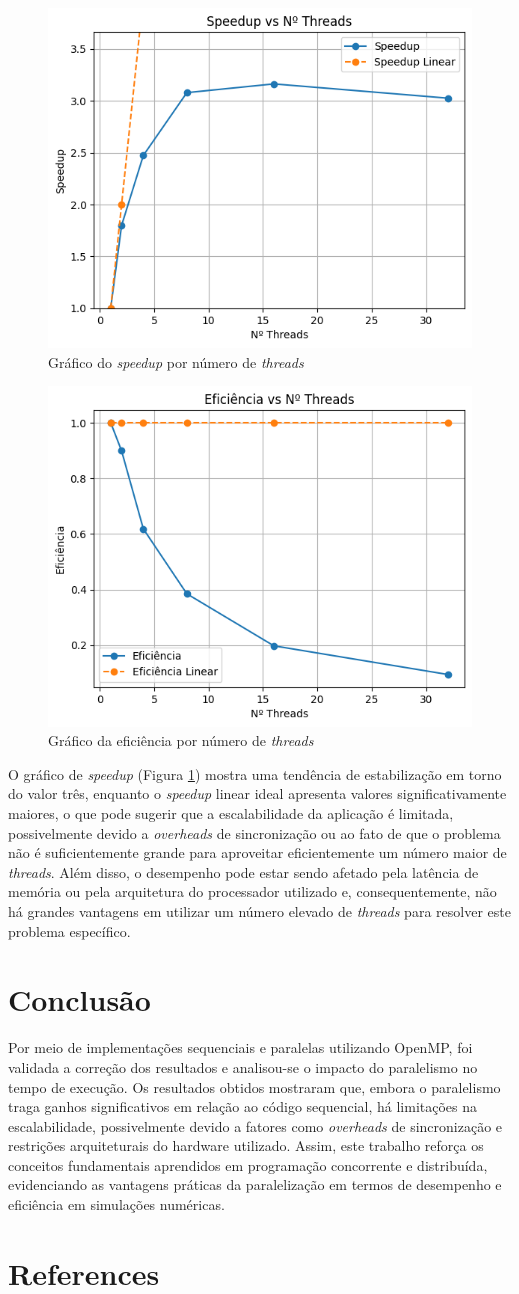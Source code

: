 \documentclass[12pt]{article}
\begin{document}
\begin{figure}[ht]
\centering
\includegraphics[width=.5\textwidth]{figs/speedupxthreads.png}
\caption{Gráfico do \textit{speedup} por número de \textit{threads}}
\label{fig:speedupOMP}
\end{figure}

\begin{figure}[ht]
\centering
\includegraphics[width=.5\textwidth]{figs/eficienciaxthreads.png}
\caption{Gráfico da eficiência por número de \textit{threads}}
\label{fig:eficienciaOMP}
\end{figure}


O gráfico de \textit{speedup} (Figura \ref{fig:speedupOMP}) mostra uma tendência de estabilização em torno do valor três, enquanto o \textit{speedup} linear ideal apresenta valores significativamente maiores, o que pode sugerir que a escalabilidade da aplicação é limitada, possivelmente devido a \textit{overheads} de sincronização ou ao fato de que o problema não é suficientemente grande para aproveitar eficientemente um número maior de \textit{threads}. Além disso, o desempenho pode estar sendo afetado pela latência de memória ou pela arquitetura do processador utilizado e, consequentemente, não há grandes vantagens em utilizar um número elevado de \textit{threads} para resolver este problema específico.

\section{Conclusão}
Por meio de implementações sequenciais e paralelas utilizando OpenMP, foi validada a correção dos resultados e analisou-se o impacto do paralelismo no tempo de execução. Os resultados obtidos mostraram que, embora o paralelismo traga ganhos significativos em relação ao código sequencial, há limitações na escalabilidade, possivelmente devido a fatores como \textit{overheads} de sincronização e restrições arquiteturais do hardware utilizado. Assim, este trabalho reforça os conceitos fundamentais aprendidos em programação concorrente e distribuída, evidenciando as vantagens práticas da paralelização em termos de desempenho e eficiência em simulações numéricas.

\section{References}





\end{document}
